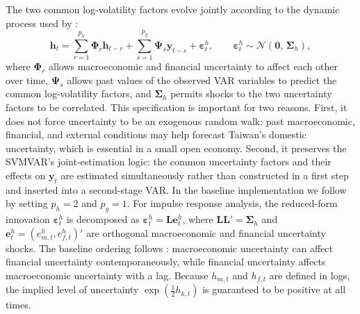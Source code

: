 The two common log-volatility factors evolve jointly according to the dynamic process used by \citet{davidson2025investigating}:
%
\begin{equation}
\mathbf{h}_t
= \sum_{r=1}^{p_h} \boldsymbol{\Phi}_r \mathbf{h}_{t-r}
  + \sum_{s=1}^{p_y} \boldsymbol{\Psi}_s \mathbf{y}_{t-s}
  + \boldsymbol{\varepsilon}_t^{h},
\qquad
\boldsymbol{\varepsilon}_t^{h} \sim \mathcal{N}(\mathbf{0},\, \boldsymbol{\Sigma}_h),
\label{eq:logvol}
\end{equation}
%
where $\boldsymbol{\Phi}_r$ allows macroeconomic and financial uncertainty to affect each other over time, $\boldsymbol{\Psi}_s$ allows past values of the observed VAR variables to predict the common log-volatility factors, and $\boldsymbol{\Sigma}_h$ permits shocks to the two uncertainty factors to be correlated. This specification is important for two reasons. First, it does not force uncertainty to be an exogenous random walk: past macroeconomic, financial, and external conditions may help forecast Taiwan's domestic uncertainty, which is essential in a small open economy. Second, it preserves the SVMVAR's joint-estimation logic: the common uncertainty factors and their effects on $\mathbf{y}_t$ are estimated simultaneously rather than constructed in a first step and inserted into a second-stage VAR. In the baseline implementation we follow \citet{davidson2025investigating} by setting $p_h=2$ and $p_y=1$. For impulse response analysis, the reduced-form innovation $\boldsymbol{\varepsilon}_t^{h}$ is decomposed as $\boldsymbol{\varepsilon}_t^{h}=\mathbf{L}\mathbf{e}_t^{h}$, where $\mathbf{L}\mathbf{L}'=\boldsymbol{\Sigma}_h$ and $\mathbf{e}_t^{h}=(e_{m,t}^{h}, e_{f,t}^{h})'$ are orthogonal macroeconomic and financial uncertainty shocks. The baseline ordering follows \citet{davidson2025investigating}: macroeconomic uncertainty can affect financial uncertainty contemporaneously, while financial uncertainty affects macroeconomic uncertainty with a lag. Because $h_{m,t}$ and $h_{f,t}$ are defined in logs, the implied level of uncertainty $\exp(\tfrac{1}{2}h_{k,t})$ is guaranteed to be positive at all times.


